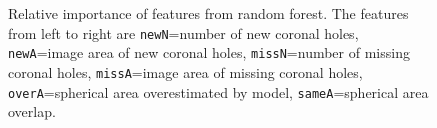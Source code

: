 \begin{figure}[!t]
	\color{blue}
	        \caption{
	        	\color{blue}
	        	Relative importance of features from random forest. The features from left to right are 
		\texttt{newN}=number of new coronal holes, 
		\texttt{newA}=image area of new coronal holes,
		\texttt{missN}=number of missing coronal holes,
		\texttt{missA}=image area of missing coronal holes,
		\texttt{overA}=spherical area overestimated by model,
		\texttt{sameA}=spherical area overlap.}
	\label{fig:randomForest_features}
\end{figure}